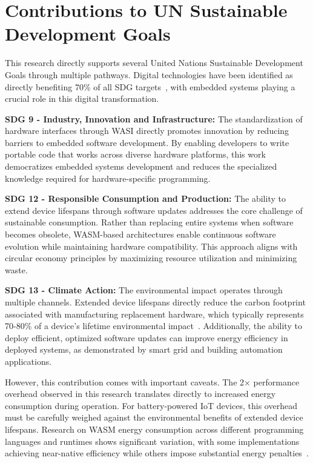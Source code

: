 \section*{Contributions to UN Sustainable Development Goals}

This research directly supports several United Nations Sustainable Development Goals through multiple pathways. Digital technologies have been identified as directly benefiting 70\% of all SDG targets~\cite{ITUUNDPJoin}, with embedded systems playing a crucial role in this digital transformation.

\textbf{SDG 9 - Industry, Innovation and Infrastructure:} The standardization of hardware interfaces through WASI directly promotes innovation by reducing barriers to embedded software development. By enabling developers to write portable code that works across diverse hardware platforms, this work democratizes embedded systems development and reduces the specialized knowledge required for hardware-specific programming.

\textbf{SDG 12 - Responsible Consumption and Production:} The ability to extend device lifespans through software updates addresses the core challenge of sustainable consumption. Rather than replacing entire systems when software becomes obsolete, WASM-based architectures enable continuous software evolution while maintaining hardware compatibility. This approach aligns with circular economy principles by maximizing resource utilization and minimizing waste.

\textbf{SDG 13 - Climate Action:} The environmental impact operates through multiple channels. Extended device lifespans directly reduce the carbon footprint associated with manufacturing replacement hardware, which typically represents 70-80\% of a device's lifetime environmental impact~\cite{tankEmbeddedCarbonHidden2023}. Additionally, the ability to deploy efficient, optimized software updates can improve energy efficiency in deployed systems, as demonstrated by smart grid and building automation applications.

However, this contribution comes with important caveats. The 2× performance overhead observed in this research translates directly to increased energy consumption during operation. For battery-powered IoT devices, this overhead must be carefully weighed against the environmental benefits of extended device lifespans. Research on WASM energy consumption across different programming languages and runtimes shows significant variation, with some implementations achieving near-native efficiency while others impose substantial energy penalties~\cite{wagner_energy, xiong_energy}.


